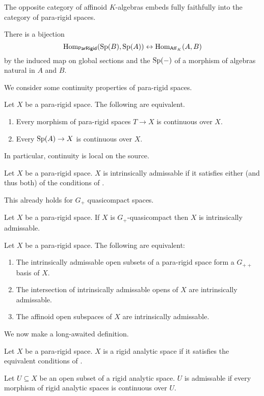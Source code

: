 The opposite category of affinoid $K$-algebras embeds fully faithfully into the category of para-rigid spaces. 
\begin{proposition}\label{def: affinoids fully faithful in pararigid}
    There is a bijection
    $$\mathrm{Hom}_{\mathsf{ParRigid}}(\mathrm{Sp}(B),\mathrm{Sp}(A))\leftrightarrow\mathrm{Hom}_{\mathsf{Aff}_{K}}(A,B)$$
    by the induced map on global sections and the $\mathrm{Sp}(-)$ of a morphism of algebras natural in $A$ and $B$. 
\end{proposition}
We consider some continuity properties of para-rigid spaces. 
\begin{proposition}\label{prop: continuity of pararigid spaces}
    Let $X$ be a para-rigid space. The following are equivalent. 
    \begin{enumerate}[label=(\alph*)]
        \item Every morphism of para-rigid spaces $T\to X$ is continuous over $X$. 
        \item Every $\mathrm{Sp}(A)\to X$ is continuous over $X$. 
    \end{enumerate}
    In particular, continuity is local on the source. 
\end{proposition}
\begin{definition}\label{def: intrinsically admissable}
    Let $X$ be a para-rigid space. $X$ is intrinsically admissable if it satisfies either (and thus both) of the conditions of . 
\end{definition}
This already holds for $G_{+}$ quasicompact spaces. 
\begin{proposition}\label{prop: any G plus qc space is intrinsically admissable}
    Let $X$ be a para-rigid space. If $X$ is $G_{+}$-quasicompact then $X$ is intrinsically admissable. 
\end{proposition}
\begin{proposition}\label{prop: admissability on pararigid spaces}
    Let $X$ be a para-rigid space. The following are equivalent:
    \begin{enumerate}[label=(\alph*)]
        \item The intrinsically admissable open subsets of a para-rigid space form a $G_{++}$ basis of $X$. 
        \item The intersection of intrinsically admissable opens of $X$ are intrinsically admissable. 
        \item The affinoid open subspaces of $X$ are intrinsically admissable. 
    \end{enumerate}
\end{proposition}
We now make a long-awaited definition. 
\begin{definition}\label{def: rigid analytic space}
    Let $X$ be a para-rigid space. $X$ is a rigid analytic space if it satisfies the equivalent conditions of . 
\end{definition}
\begin{definition}\label{def: admissable open}
    Let $U\subseteq X$ be an open subset of a rigid analytic space. $U$ is admissable if every morphism of rigid analytic spaces is continuous over $U$. 
\end{definition}